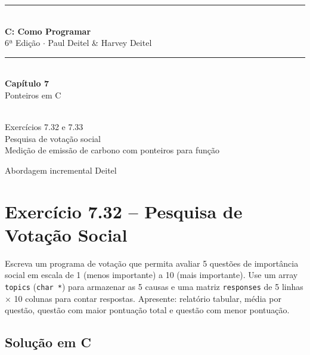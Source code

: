 \documentclass[12pt,a4paper]{article}
\begin{document}
\begin{titlepage}
  \centering\vspace*{2cm}
  {\color{deitelblue}\rule{\linewidth}{2pt}}\\[0.4cm]
  {\huge\bfseries\color{deitelblue}C: Como Programar}\\[0.2cm]
  {\large\color{deitelblue}6ª Edição $\cdot$ Paul Deitel \& Harvey Deitel}\\[0.2cm]
  {\color{deitelblue}\rule{\linewidth}{2pt}}\\[1cm]
  {\LARGE\bfseries Capítulo 7}\\[0.3cm]
  {\Large\color{deitelblue!80}Ponteiros em C}\\[0.8cm]
  \begin{tcolorbox}[colback=ecolightgreen,colframe=ecogreen,width=0.85\linewidth]
    \\[0.3cm]
    {\normalsize Exercícios 7.32 e 7.33\\[0.2cm]
    Pesquisa de votação social\\
    Medição de emissão de carbono com ponteiros para função}
  \end{tcolorbox}
  \vfill{\small Abordagem incremental Deitel}
\end{titlepage}

\tableofcontents\newpage

\section{Exercício 7.32 -- Pesquisa de Votação Social}

\begin{enunciadoBox}[Enunciado 7.32]
Escreva um programa de votação que permita avaliar 5 questões de importância social
em escala de 1 (menos importante) a 10 (mais importante). Use um array \texttt{topics}
(\texttt{char *}) para armazenar as 5 causas e uma matriz \texttt{responses} de
5 linhas × 10 colunas para contar respostas. Apresente: relatório tabular,
média por questão, questão com maior pontuação total e questão com menor pontuação.
\end{enunciadoBox}

\subsection*{Solução em C}
\end{document}
